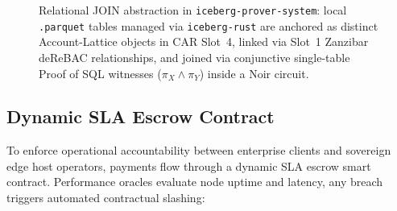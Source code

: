 \documentclass[a4paper,11pt,twoside,parskip=half-,headings=small]{scrartcl}
\newcommand{\code}[1]{\texttt{#1}}
\begin{document}
\begin{figure}[H]
{%
}
\caption{Relational JOIN abstraction in \code{iceberg-prover-system}: local \code{.parquet} tables managed via \code{iceberg-rust} are anchored as distinct Account-Lattice objects in CAR Slot~4, linked via Slot~1 Zanzibar deReBAC relationships, and joined via conjunctive single-table Proof of SQL witnesses ($\pi_X \land \pi_Y$) inside a Noir circuit.}
\label{fig:iceberg_noir_join}
\end{figure}

\subsection{Dynamic SLA Escrow Contract}
\label{sec:dsla_escrow}

To enforce operational accountability between enterprise clients and sovereign edge
host operators, payments flow through a dynamic SLA escrow smart contract. Performance
oracles evaluate node uptime and latency, any breach triggers automated contractual slashing:
\end{document}
